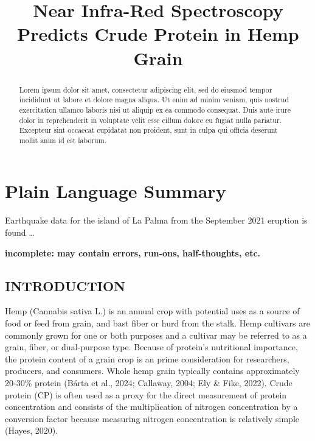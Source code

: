 \documentclass[
]{agujournal2019}
\begin{document}
\title{Near Infra-Red Spectroscopy Predicts Crude Protein in Hemp Grain}



\begin{abstract}
Lorem ipsum dolor sit amet, consectetur adipiscing elit, sed do eiusmod
tempor incididunt ut labore et dolore magna aliqua. Ut enim ad minim
veniam, quis nostrud exercitation ullamco laboris nisi ut aliquip ex ea
commodo consequat. Duis aute irure dolor in reprehenderit in voluptate
velit esse cillum dolore eu fugiat nulla pariatur. Excepteur sint
occaecat cupidatat non proident, sunt in culpa qui officia deserunt
mollit anim id est laborum.
\end{abstract}

\section*{Plain Language Summary}
Earthquake data for the island of La Palma from the September 2021
eruption is found \ldots{}



\textbf{incomplete: may contain errors, run-ons, half-thoughts, etc.}

\subsection{INTRODUCTION}\label{introduction}

Hemp (Cannabis sativa L.) is an annual crop with potential uses as a
source of food or feed from grain, and bast fiber or hurd from the
stalk. Hemp cultivars are commonly grown for one or both purposes and a
cultivar may be referred to as a grain, fiber, or dual-purpose type.
Because of protein's nutritional importance, the protein content of a
grain crop is an prime consideration for researchers, producers, and
consumers. Whole hemp grain typically contains approximately 20-30\%
protein (Bárta et al., 2024; Callaway, 2004; Ely \& Fike, 2022). Crude
protein (CP) is often used as a proxy for the direct measurement of
protein concentration and consists of the multiplication of nitrogen
concentration by a conversion factor because measuring nitrogen
concentration is relatively simple (Hayes, 2020).
\end{document}
